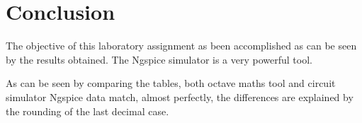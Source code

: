 \section{Conclusion}
\label{sec:conclusion}

\tab The objective of this laboratory assignment as been accomplished as can be seen by the results obtained. The Ngspice simulator is a very powerful tool.\par
As can be seen by comparing the tables, both octave maths tool and circuit simulator Ngspice data match, almost perfectly, the differences are explained by the rounding of the last decimal case.
